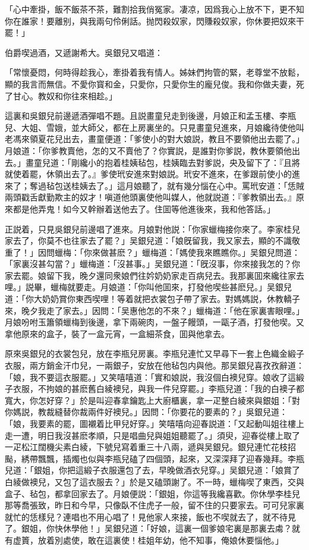 「心中牽掛，飯不飯茶不茶，難割拾我俏冤家。凄凉，因爲我心上放不下，更不知你在誰家！要離别，與我兩句伶俐話。抛閃殺奴家，閃賺殺奴家，你休要把奴來干罷！」

伯爵喫過酒，又遞謝希大。吳銀兒又唱道：

「常懷憂悶，何時得趁我心，牽掛着我有情人。姊妹們拘管的緊，老尊堂不放鬆，顯的我言而無信。不愛你寳和金，只愛你，只愛你生的龐兒俊。我和你做夫妻，死了甘心。教奴和你往來相趁。」

這裏和吳銀兒前邊遞酒彈唱不題。且説畫童兒走到後邊，月娘正和孟玉樓、李瓶兒、大姐、雪娥，並大師父，都在上房裏坐的。只見畫童兒進來，月娘纔待使他叫老馮來領夏花兒出去，畫童便道：「爹使小的對大娘説，教且不要領他出去罷了。」月娘道：「你爹教賣他，怎的又不賣他了？你實説，是誰對你爹説，教休要領他出去。」畫童兒道：「剛纔小的抱着桂姨毡包，桂姨臨去對爹説，央及留下了：『且將就使着罷，休領出去了。』爹使玳安進來對娘説。玳安不進來，在爹跟前使小的進來了；奪過毡包送桂姨去了。」這月娘聽了，就有幾分惱在心中。罵玳安道：「恁賊兩頭戳舌獻勤欺主的奴才！嗔道他頭裏使他叫媒人，他就説道：『爹教領出去。』原來都是他弄鬼！如今又幹辦着送他去了。住囬等他進後來，我和他答話。」

正説着，只見吳銀兒前邊唱了進來。月娘對他説：「你家蠟梅接你來了。李家桂兒家去了，你莫不也往家去了罷？」吴銀兒道：「娘旣留我，我又家去，顯的不識敬重了！」因問蠟梅：「你來做甚麽？」蠟梅道：「媽使我來瞧瞧你。」吴銀兒問道：「家裏沒甚勾當？」蠟梅道：「沒甚事。」吴銀兒道：「旣沒事，你來接我怎的？你家去罷。娘留下我，晚夕還同衆娘們往妗奶奶家走百病兒去。我那裏囬來纔往家去哩。」説畢，蠟梅就要走。月娘道：「你叫他囬來，打發他喫些甚麽兒。」吴銀兒道：「你大奶奶賞你東西喫哩！等着就把衣裳包子帶了家去。對媽媽説，休教轎子來，晚夕我走了家去。」因問：「吴惠他怎的不來？」蠟梅道：「他在家裏害眼哩。」月娘吩咐玉簫領蠟梅到後邊，拿下兩碗肉，一盤子饅頭，一甌子酒，打發他喫。又拿他原來的盒子，裝了一盒元宵，一盒細茶食，囬與他拿去。

原來吳銀兒的衣裳包兒，放在李瓶兒房裏。李瓶兒連忙又早尋下一套上色織金緞子衣服，兩方銷金汗巾兒，一兩銀子，安放在他毡包内與他。那吴銀兒喜孜孜辭道：「娘，我不要這衣服罷。」又笑嘻嘻道：「實和娘説，我沒個白襖兒穿。娘收了這緞子衣服，不拘娘的甚麽舊白綾襖兒，與我一件兒穿罷。」李瓶兒道：「我的白襖子都寬大，你怎好穿？」於是叫迎春拿鑰匙上大廚櫃裏，拿一疋整白綾來與銀姐：「對你媽説，教裁縫替你裁兩件好襖兒。」因問：「你要花的要素的？」吳銀兒道：「娘，我要素的罷，圖襯着比甲兒好穿。」笑嘻嘻向迎春説道：「又起動叫姐往樓上走一遭，明日我沒甚麽孝順，只是唱曲兒與姐姐聽罷了。」須臾，迎春從樓上取了一疋松江闊機尖素白綾，下號兒寫着重三十八兩，遞與吴銀兒。銀兒連忙花枝招颭，綉帶飄飄，插燭也似與李瓶兒磕了四個頭，起來，又深深拜了迎春幾拜。李瓶兒道：「銀姐，你把這緞子衣服還包了去，早晚做酒衣兒穿。」吴銀兒道：「娘賞了白綾做襖兒，又包了這衣服去？」於是又磕頭謝了。不一時，蠟梅喫了東西，交與盒子、毡包，都拿回家去了。月娘便説：「銀姐，你這等我纔喜歡。你休學李桂兒那等喬張致，昨日和今早，只像臥不住虎子一般，留不住的只要家去。可可兒家裏就忙的恁樣兒？連唱也不用心唱了！見他家人來接，飯也不喫就去了，就不待見了。銀姐，你快休學他！」吴銀兒道：「好娘，這裏一個爹娘宅裏是那裏去䖏？就有虚篢，放着別處使，敢在這裏使！桂姐年幼，他不知事，俺娘休要惱他。」

